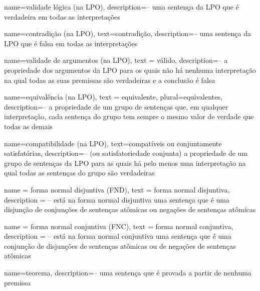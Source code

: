 
{
name=validade lógica (na LPO),
description={-- uma sentença da LPO que é verdadeira em todas as interpretações}
}

{
  name=contradição (na LPO),
  text=contradição,
description={--  uma sentença da LPO que é falsa em todas as interpretações}
} 

{
  name=validade de argumentos (na LPO),
  text = válido,
description={-- a propriedade dos argumentos da LPO para os quais não há nenhuma interpretação na qual todas as suas premissas são verdadeiras e a conclusão é falsa}
}

{
  name=equivalência (na LPO),
  text = equivalente,
  plural=equivalentes,
description={-- a propriedade de um grupo de sentenças que, em qualquer interpretação, cada sentença do grupo tem sempre o mesmo valor de verdade que todas as demais}
}

{
  name=compatibilidade (na LPO),
  text=compatíveis ou conjuntamente satisfatórias,
description={-- (ou satisfatoriedade conjunta) a propriedade de um grupo de sentenças da LPO para as quais há pelo menos uma interpretação na qual todas as sentenças do grupo são verdadeiras}
}

{
  name = forma normal disjuntiva (FND),
  text = forma normal disjuntiva,
  description = {-- está na forma normal disjuntiva uma sentença que é uma disjunção de conjunções de sentenças atômicas ou negações de sentenças atômicas}
}

{
  name = forma normal conjuntiva (FNC),
  text = forma normal conjuntiva,
  description = {-- está na forma normal conjuntiva uma sentença que é uma conjunção de disjunções de sentenças atômicas ou de negações de sentenças atômicas}
}

  
  {
  name=teorema,
  description={-- uma sentença que é provada a partir de nenhuma premissa}
  }
  
